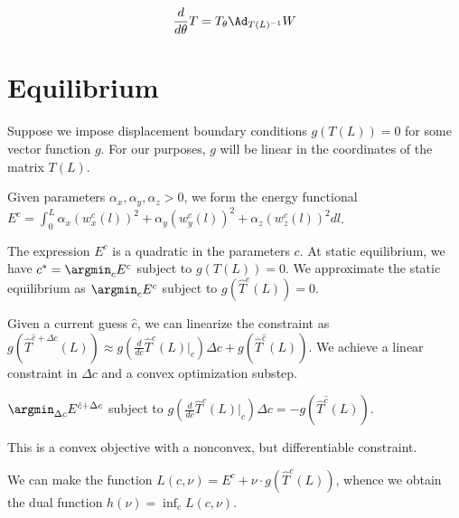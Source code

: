 \documentclass[12pt]{article}
\begin{document}
$$ \frac{d}{d\theta} T = T_\theta \Ad_{T(L)^{-1}} W$$

\section{Equilibrium}
Suppose we impose displacement boundary conditions $g(T(L)) = 0$
for some vector function $g$. For our purposes, $g$ will be linear
in the coordinates of the matrix $T(L)$.

Given parameters $\alpha_x, \alpha_y, \alpha_z > 0$, we form the
energy functional $E^c = \int_0^L \alpha_x (w_x^{c}(l))^2 + \alpha_y (w_y^c(l))^2 + \alpha_z (w_z^{c}(l))^2 dl$.

The expression $E^c$ is a quadratic in the parameters $c$. At static equilibrium,
we have $c^* = \argmin_c E^c$ subject to $g(T(L)) = 0$. We approximate the static equilibrium as $\argmin_c E^c$ subject to $g(\hat T^c(L)) = 0.$

Given a current guess $\hat c$, we can linearize the constraint as
$g( \hat T^{\hat c+\Delta c}(L)) \approx g( \frac{d}{dc} \hat T^{c}(L)|_{\hat c}) \Delta c + g( \hat T^{\hat c}(L))$. We achieve a linear constraint in $\Delta c$ and a convex optimization substep.

$\argmin_{\Delta c} E^{\hat c + \Delta c}$ subject to $g( \frac{d}{dc} \hat T^{c}(L)|_{\hat c}) \Delta c = -g( \hat T^{\hat c}(L))$.

This is a convex objective with a nonconvex, but differentiable constraint.

We can make the function $L(c, \nu) =  E^c + \nu \cdot g(\hat T^c(L))$, whence we obtain the dual function $h(\nu) = \inf_c L(c, \nu)$.







                    
                      
\end{document}
